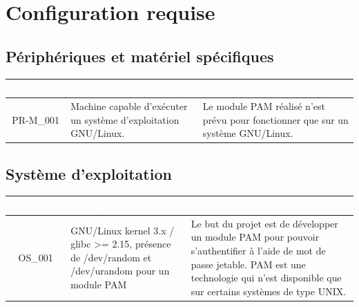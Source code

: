 \documentclass{"../../res/univ-projet"}
\begin{document}
\section{Configuration requise}

\subsection{Périphériques et matériel spécifiques}
\begin{tabular}{|c|p{}|p{}|}
\hline
\rowcolor{gray}
\textcolor{white}{\bfseries Identifiant} & 
\textcolor{white}{\bfseries Description} &
\textcolor{white}{\bfseries Justification} \\
\hline
PR-M\_001 &
Machine capable d'exécuter un système d'exploitation GNU/Linux. & 
Le module PAM réalisé n'est prévu pour fonctionner que sur un système GNU/Linux. \\
\hline
\end{tabular}

\subsection{Système d'exploitation}
\begin{tabular}{|c|p{}|p{}|}
\hline
\rowcolor{gray}
\textcolor{white}{\bfseries Identifiant} & 
\textcolor{white}{\bfseries Description} &
\textcolor{white}{\bfseries Justification} \\
\hline
OS\_001& 
GNU/Linux kernel 3.x / glibc >= 2.15, présence de /dev/random et /dev/urandom 
pour un module PAM &
Le but du projet est de développer un module PAM pour pouvoir s'authentifier
à l'aide de mot de passe jetable. PAM est une technologie qui n'est disponible
que sur certains systèmes de type UNIX.\\
\hline
\end{tabular}
\end{document}
